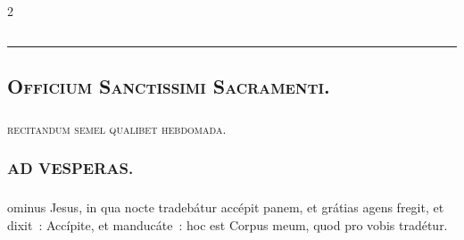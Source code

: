 \documentclass[9pt,twoside]{extarticle}
\begin{document}
\begin{multicols}{2}
{{\subsection*{\center \textsc{}}
\subsubsection*{\center {}}
\begin{center}\textcolor{red}{\rule{\linewidth}{0.5pt}} \end{center}

\subsection*{\center \textsc{Officium Sanctissimi Sacramenti.}}
\subsubsection*{\center {}}
\begin{center}\textsc{recitandum semel qualibet hebdomada.}\end{center}
\subsubsection*{\center \textsc{AD VESPERAS.}}
\subsubsection*{}
ominus Jesus, in qua nocte tradebátur accépit panem, et grátias agens fregit, et dixit~: Accípite, et manducáte~: hoc est Corpus meum, quod pro vobis tradétur.

}}
\end{multicols}
\end{document}
